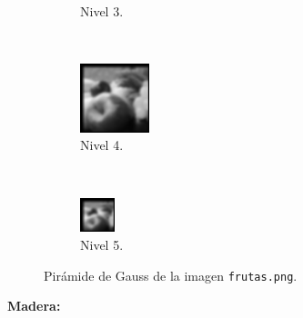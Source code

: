 \documentclass[12pt, letterpaper]{article}
\begin{document}
\begin{figure}[H]
\begin{subfigure}[t]{0.32\textwidth}
      \caption{Nivel 3.}
  \end{subfigure}
  ~ 
  \begin{subfigure}[t]{0.32\textwidth}
      \centering
      \includegraphics[width = 0.22\textwidth]{frutas/gp4.png}
      \caption{Nivel 4.}
  \end{subfigure}
  ~ 
  \begin{subfigure}[t]{0.32\textwidth}
      \centering
      \includegraphics[width = 0.11\textwidth]{frutas/gp5.png}
      \caption{Nivel 5.}
  \end{subfigure}
  \caption{Pirámide de Gauss de la imagen \texttt{frutas.png}.}
  \label{gpfrutas}
\end{figure}

\par \textbf{Madera:}
\end{document}

